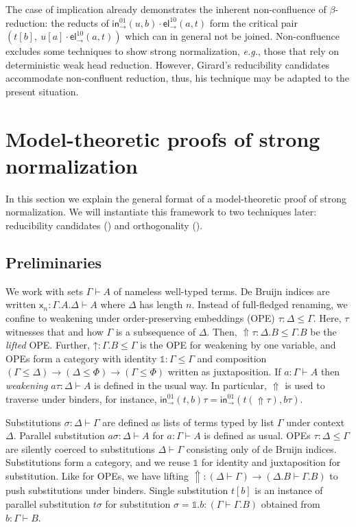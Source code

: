 \documentclass[a4paper,USenglish,cleveref, autoref, thm-restate]{lipics-v2019}
\newcommand{\eg}{\emph{e.g.}\xspace}
\newcommand{\sid}{\mathds{1}}
\newcommand{\x}{\mathsf{x}}
\newcommand{\tin}{\ensuremath{\mathsf{in}}}
\newcommand{\inn}[2]{\ensuremath{\tin_{#1}^{#2}}}
\newcommand{\tel}{\mathsf{el}}
\newcommand{\el}[2]{\ensuremath{\tel_{#1}^{#2}}}
\newcommand{\Up}{\mathop{\Uparrow}}
\newcommand{\up}{\mathord{\uparrow}}
\begin{document}
The case of implication already demonstrates the inherent
non-confluence of $\beta$-reduction: the reducts of
$\inn\to{01}(u,b) \cdot \el\to{10}(a,t)$ form the critical pair
$(t[b],\ u[a] \cdot \el\to{10}(a,t))$ which can in general not be
joined.  Non-confluence excludes some techniques to show strong
normalization, \eg, those that rely on deterministic weak head
reduction.  However, Girard's reducibility candidates accommodate
non-confluent reduction, thus, his technique may be adapted to the
present situation.

\section{Model-theoretic proofs of strong normalization}
\label{sec:model}

In this section we explain the general format of a model-theoretic
proof of strong normalization.  We will instantiate this framework to two techniques later: reducibility candidates () and orthogonality ().

\subsection{Preliminaries}
\label{sec:prelim}

We work with sets $\Gamma \vdash A$ of nameless well-typed terms.
De Bruijn indices are written $\x_n : \Gamma.A.\Delta \vdash A$ where
$\Delta$ has length $n$.
Instead of full-fledged renaming, we confine to
weakening under order-preserving embeddings (OPE)
$\tau : \Delta \leq \Gamma$.  Here, $\tau$ witnesses that and how
$\Gamma$ is a subsequence of $\Delta$.
Then, $\Up\tau : \Delta.B \leq \Gamma.B$ be the \emph{lifted} OPE.
Further, $\up : \Gamma.B \leq \Gamma$ is the OPE for weakening by one
variable, and OPEs form a category with identity $\sid : \Gamma \leq
\Gamma$ and composition %
$(\Gamma \leq \Delta) \to (\Delta \leq \Phi) \to (\Gamma \leq \Phi)$
written as juxtaposition.
If $a : \Gamma \vdash A$ then
\emph{weakening} $a\tau : \Delta \vdash A$ is defined in the usual way.
In particular, $\Up$ is used to traverse under binders, for instance,
$\inn\to{01}(t,b)\tau = \inn\to{01}(t(\Up\tau),b\tau)$.

Substitutions $\sigma : \Delta \vdash \Gamma$ are defined as lists of
terms typed by list $\Gamma$ under context $\Delta$.  Parallel
substitution $a\sigma : \Delta \vdash A$ for $a : \Gamma \vdash A$ is
defined as usual.  OPEs $\tau : \Delta \leq \Gamma$ are silently
coerced to substitutions $\Delta \vdash \Gamma$ consisting only of de
Bruijn indices.
Substitutions form a category, and we reuse $\sid$ for
identity and %
juxtaposition for substitution.
Like for OPEs, we have lifting
$\Up : (\Delta \vdash \Gamma) \to (\Delta.B \vdash \Gamma.B)$ to push
substitutions under binders.
%
Single substitution $t[b]$ is
an instance of parallel substitution $t\sigma$ for substitution
$\sigma = \sid.b : (\Gamma \vdash \Gamma.B)$ obtained from $b : \Gamma \vdash B$.
\end{document}
